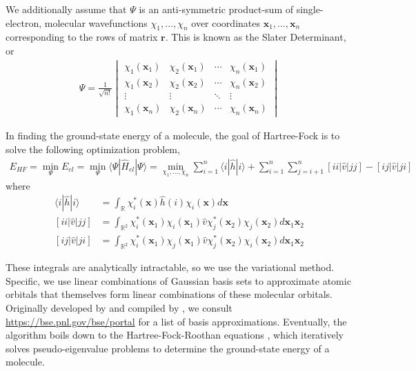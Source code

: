 \documentclass[12pt]{article}
\newcommand{\bd}[1]{\boldsymbol{#1}}
\newcommand{\Hel}{\hat{H}_{el}}
\newcommand{\R}{\mathbb{R}}
\begin{document}
We additionally assume that $\Psi$ is an anti-symmetric product-sum of single-electron, molecular wavefunctions $\chi_1, \ldots, \chi_n$ over coordinates $\bd x_1, \ldots, \bd x_n$ corresponding to the rows of matrix $\bd r$.  This is known as the Slater Determinant, or
\begin{align*}
\Psi = \frac{1}{\sqrt{n!}} 
\begin{vmatrix}
\chi_1(\bd x_1) & \chi_2(\bd x_1)  & \cdots & \chi_n(\bd x_1) \\
\chi_1(\bd x_2) & \chi_2(\bd x_2)  & \cdots & \chi_n(\bd x_2) \\
\vdots & \vdots & \ddots & \vdots \\
\chi_1(\bd x_n) & \chi_2(\bd x_n) & \cdots & \chi_n(\bd x_n) 
\end{vmatrix}
\end{align*} 

In finding the ground-state energy of a molecule, the goal of Hartree-Fock is to solve the following optimization problem, 
\begin{align*}
E_{HF} = \min_{\Psi} E_{el} = \min_{\Psi} \langle \Psi | \Hel | \Psi \rangle = \min_{\chi_1, \ldots, \chi_n} \sum_{i=1}^n \langle i | \hat{h} | i \rangle + \sum_{i=1}^n \sum_{j=i+1}^n [ i i | \hat{v} | jj] - [ij | \hat{v} | ji]
\end{align*}
where
\begin{align*}
\langle i | \hat{h} | i \rangle &= \int_\R \chi_i^*(\bd x) \hat{h}(i) \chi_i (\bd x) d \bd x \\
[ii | \hat{v} | jj] &= \int_{\R^2} \chi_i^*(\bd x_1) \chi_i(\bd x_1) \hat{v} \chi_j^*(\bd x_2) \chi_j(\bd x_2) d\bd x_1 \bd x_2 \\
[ij | \hat{v} | ji] &= \int_{\R^2} \chi_i^*(\bd x_1) \chi_j(\bd x_1) \hat{v} \chi_j^*(\bd x_2) \chi_i(\bd x_2) d\bd x_1 \bd x_2
\end{align*}

These integrals are analytically intractable, so we use the variational method.  Specific, we use linear combinations of Gaussian basis sets to approximate atomic orbitals that themselves form linear combinations of these molecular orbitals.  Originally developed by \cite{feller1996} and compiled by \cite{schuchardt2007}, we consult \href{https://bse.pnl.gov/bse/portal}{https://bse.pnl.gov/bse/portal} for a list of basis approximations.  Eventually, the algorithm boils down to the Hartree-Fock-Roothan equations \cite{szabo2012}, which iteratively solves pseudo-eigenvalue problems to determine the ground-state energy of a molecule.  
\end{document}
